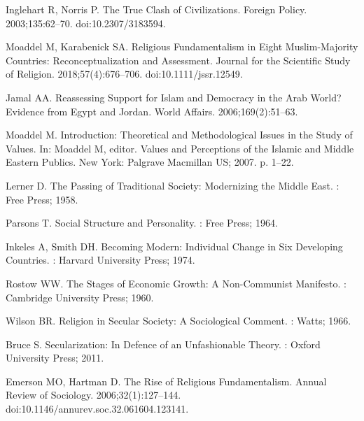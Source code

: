 \documentclass[10pt,letterpaper]{article}
\begin{document}
\begin{thebibliography}{10}
Inglehart R, Norris P.
\newblock The {{True Clash}} of {{Civilizations}}.
\newblock Foreign Policy. 2003;135:62--70.
\newblock doi:{10.2307/3183594}.

Moaddel M, Karabenick SA.
\newblock Religious {{Fundamentalism}} in {{Eight Muslim}}-{{Majority
  Countries}}: {{Reconceptualization}} and {{Assessment}}.
\newblock Journal for the Scientific Study of Religion. 2018;57(4):676--706.
\newblock doi:{10.1111/jssr.12549}.

Jamal AA.
\newblock Reassessing {{Support}} for {{Islam}} and {{Democracy}} in the {{Arab
  World}}? {{Evidence}} from {{Egypt}} and {{Jordan}}.
\newblock World Affairs. 2006;169(2):51--63.

Moaddel M.
\newblock Introduction: {{Theoretical}} and {{Methodological Issues}} in the
  {{Study}} of {{Values}}.
\newblock In: Moaddel M, editor. Values and {{Perceptions}} of the {{Islamic}}
  and {{Middle Eastern Publics}}. {New York}: {Palgrave Macmillan US}; 2007. p.
  1--22.

Lerner D.
\newblock The {{Passing}} of {{Traditional Society}}: {{Modernizing}} the
  {{Middle East}}.
: {Free Press}; 1958.

Parsons T.
\newblock Social {{Structure}} and {{Personality}}.
: {Free Press}; 1964.

Inkeles A, Smith DH.
\newblock Becoming {{Modern}}: {{Individual Change}} in {{Six Developing
  Countries}}.
: {Harvard University Press}; 1974.

Rostow WW.
\newblock The {{Stages}} of {{Economic Growth}}: A Non-{{Communist Manifesto}}.
: {Cambridge University Press}; 1960.

Wilson BR.
\newblock Religion in {{Secular Society}}: A {{Sociological Comment}}.
: {Watts}; 1966.

Bruce S.
\newblock Secularization: {{In Defence}} of an {{Unfashionable Theory}}.
: {Oxford University Press}; 2011.

Emerson MO, Hartman D.
\newblock The {{Rise}} of {{Religious Fundamentalism}}.
\newblock Annual Review of Sociology. 2006;32(1):127--144.
\newblock doi:{10.1146/annurev.soc.32.061604.123141}.


\end{thebibliography}
\end{document}
